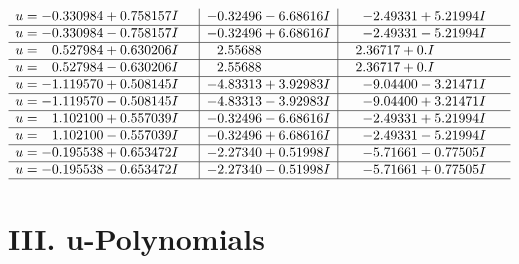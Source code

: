 \documentclass[1p]{elsarticle_modified}
\theoremstyle{definition}
\begin{document}
$$\begin{array}{c|c|c}
\begin{aligned}
u &= -0.330984 + 0.758157 I\end{aligned}
 & -0.32496 - 6.68616 I & -2.49331 + 5.21994 I \\ \hline\begin{aligned}
u &= -0.330984 - 0.758157 I\end{aligned}
 & -0.32496 + 6.68616 I & -2.49331 - 5.21994 I \\ \hline\begin{aligned}
u &= \phantom{-}0.527984 + 0.630206 I\end{aligned}
 & \phantom{-}2.55688\phantom{ +0.000000I} & \phantom{-}2.36717 + 0. I\phantom{ +0.000000I} \\ \hline\begin{aligned}
u &= \phantom{-}0.527984 - 0.630206 I\end{aligned}
 & \phantom{-}2.55688\phantom{ +0.000000I} & \phantom{-}2.36717 + 0. I\phantom{ +0.000000I} \\ \hline\begin{aligned}
u &= -1.119570 + 0.508145 I\end{aligned}
 & -4.83313 + 3.92983 I & -9.04400 - 3.21471 I \\ \hline\begin{aligned}
u &= -1.119570 - 0.508145 I\end{aligned}
 & -4.83313 - 3.92983 I & -9.04400 + 3.21471 I \\ \hline\begin{aligned}
u &= \phantom{-}1.102100 + 0.557039 I\end{aligned}
 & -0.32496 - 6.68616 I & -2.49331 + 5.21994 I \\ \hline\begin{aligned}
u &= \phantom{-}1.102100 - 0.557039 I\end{aligned}
 & -0.32496 + 6.68616 I & -2.49331 - 5.21994 I \\ \hline\begin{aligned}
u &= -0.195538 + 0.653472 I\end{aligned}
 & -2.27340 + 0.51998 I & -5.71661 - 0.77505 I \\ \hline\begin{aligned}
u &= -0.195538 - 0.653472 I\end{aligned}
 & -2.27340 - 0.51998 I & -5.71661 + 0.77505 I\\
 \hline 
 \end{array}$$\newpage
\newpage\renewcommand{\arraystretch}{1}
\centering \section*{ III. u-Polynomials}
\end{document}
